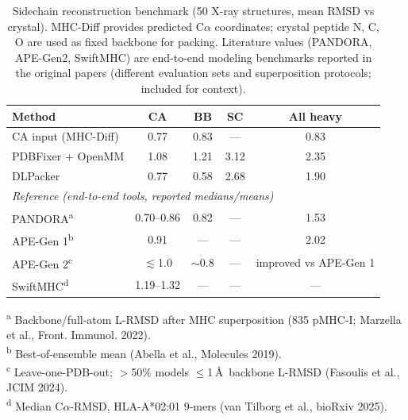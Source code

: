 
\begin{table}[ht]
\centering
\caption{Sidechain reconstruction benchmark (50 X-ray structures, mean RMSD vs crystal). MHC-Diff provides predicted C$\alpha$ coordinates; crystal peptide N, C, O are used as fixed backbone for packing. Literature values (PANDORA, APE-Gen2, SwiftMHC) are end-to-end modeling benchmarks reported in the original papers (different evaluation sets and superposition protocols; included for context).}
\label{tab:sidechain_benchmark}
\begin{tabular}{lcccc}
\toprule
Method & CA & BB & SC & All heavy \\
\midrule
CA input (MHC-Diff) & 0.77 & 0.83 & --- & 0.83 \\
PDBFixer + OpenMM & 1.08 & 1.21 & 3.12 & 2.35 \\
DLPacker & 0.77 & 0.58 & 2.68 & 1.90 \\
\midrule
\multicolumn{5}{l}{\textit{Reference (end-to-end tools, reported medians/means)}} \\
PANDORA\textsuperscript{a} & 0.70--0.86 & 0.82 & --- & 1.53 \\
APE-Gen 1\textsuperscript{b} & 0.91 & --- & --- & 2.02 \\
APE-Gen 2\textsuperscript{c} & $\lesssim$1.0 & $\sim$0.8 & --- & improved vs APE-Gen 1 \\
SwiftMHC\textsuperscript{d} & 1.19--1.32 & --- & --- & --- \\
\bottomrule
\end{tabular}
\begin{flushleft}
\small
\textsuperscript{a} Backbone/full-atom L-RMSD after MHC superposition (835 pMHC-I; Marzella et al., Front. Immunol. 2022).\\
\textsuperscript{b} Best-of-ensemble mean (Abella et al., Molecules 2019).\\
\textsuperscript{c} Leave-one-PDB-out; $>$50\% models $\leq$1\,\AA\ backbone L-RMSD (Fasoulis et al., JCIM 2024).\\
\textsuperscript{d} Median C$\alpha$-RMSD, HLA-A*02:01 9-mers (van Tilborg et al., bioRxiv 2025).\\
\end{flushleft}
\end{table}
